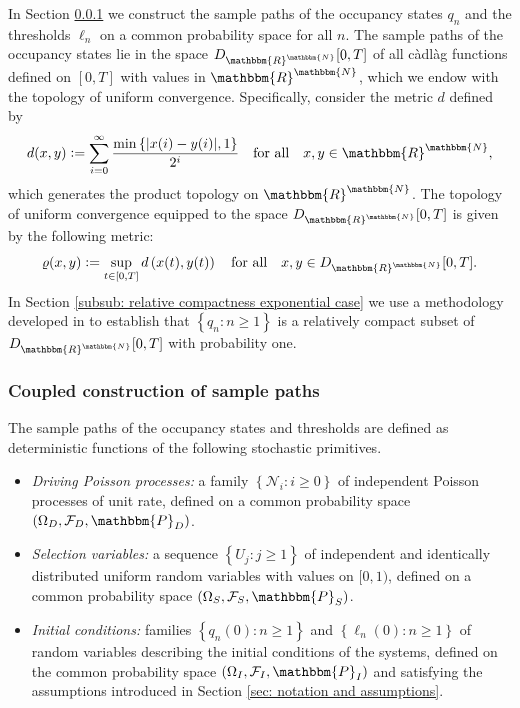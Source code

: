 \documentclass[a4paper, 12pt]{article}
\theoremstyle{definition}
\newcommand{\set}[2]{\left\{#1 : #2\right\}}
\newcommand{\defeq}{\vcentcolon=}
\newcommand{\prob}{\mathbbm{P}}
\newcommand{\calF}{\mathcal{F}}
\newcommand{\calN}{\mathcal{N}}
\newcommand{\N}{\mathbbm{N}}
\newcommand{\R}{\mathbbm{R}}
\begin{document}
In Section \ref{subsub: coupled construction of sample paths exponential case} we construct the sample paths of the occupancy states $q_n$ and the thresholds $\ell_n$ on a common probability space for all $n$. The sample paths of the occupancy states lie in the space $D_{\R^\N}[0, T]$ of all c\`adl\`ag functions defined on $[0, T]$ with values in $\R^\N$, which we endow with the topology of uniform convergence. Specifically, consider the metric $d$ defined by
\begin{equation*}
	d(x, y) \defeq \sum_{i = 0}^\infty \frac{\min\left\{|x(i) - y(i)|, 1\right\}}{2^i} \quad \text{for all} \quad x, y \in \R^\N,
\end{equation*}
which generates the product topology on $\R^\N$. The topology of uniform convergence equipped to the space $D_{\R^\N}[0, T]$ is given by the following metric:
\begin{equation*}
	\varrho(x, y) \defeq \sup_{t \in [0, T]} d\left(x(t), y(t)\right) \quad \text{for all} \quad x, y \in D_{\R^\N}[0, T].
\end{equation*}
In Section \ref{subsub: relative compactness exponential case} we use a methodology developed in \cite{bramson1998state} to establish that $\set{q_n}{n \geq 1}$ is a relatively compact subset of $D_{\R^\N}[0, T]$ with probability one.

\subsubsection{Coupled construction of sample paths}
\label{subsub: coupled construction of sample paths exponential case}

The sample paths of the occupancy states and thresholds are defined as deterministic functions of the following stochastic primitives.

\begin{itemize}
	\item \textit{Driving Poisson processes:} a family $\set{\calN_i}{i \geq 0}$ of independent Poisson processes of unit rate, defined on a common probability space $(\Omega_D, \calF_D, \prob_D)$.
	
	\item \textit{Selection variables:} a sequence $\set{U_j}{j \geq 1}$ of independent and identically distributed uniform random variables with values on $[0, 1)$,  defined on a common probability space $(\Omega_S, \calF_S, \prob_S)$.
	
	\item \textit{Initial conditions:} families $\set{q_n(0)}{n \geq 1}$ and $\set{\ell_n(0)}{n \geq 1}$ of random variables describing the initial conditions of the systems, defined on the common probability space $(\Omega_I, \calF_I, \prob_I)$ and satisfying the assumptions introduced in Section \ref{sec: notation and assumptions}.
\end{itemize}
\end{document}

